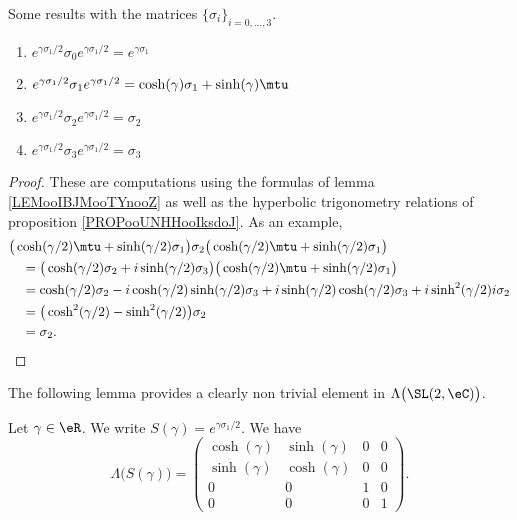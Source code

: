 \begin{lemma}       \label{LEMooPKYXooWGZkkG}
    Some results with the matrices \( \{ \sigma_i \}_{i=0,\ldots, 3}\).
    \begin{enumerate}
        \item
            \(  e^{\gamma \sigma_1/2}\sigma_0 e^{\gamma\sigma_1/2}= e^{\gamma\sigma_1}\)
        \item
            \(  e^{\gamma \sigma_1/2}\sigma_1 e^{\gamma\sigma_1/2}= \cosh(\gamma)\sigma_1+\sinh(\gamma)\mtu\)
        \item
            \(  e^{\gamma \sigma_1/2}\sigma_2 e^{\gamma\sigma_1/2}= \sigma_2\)
        \item
            \(  e^{\gamma \sigma_1/2}\sigma_3 e^{\gamma\sigma_1/2}= \sigma_3\)
    \end{enumerate}
\end{lemma}

\begin{proof}
    These are computations using the formulas of lemma \eqref{LEMooIBJMooTYnooZ} as well as the hyperbolic trigonometry relations of proposition \ref{PROPooUNHHooIksdoJ}. As an example,
    \begin{subequations}
        \begin{align}
            &\big( \cosh(\gamma/2)\mtu+\sinh(\gamma/2)\sigma_1 \big)\sigma_2\big( \cosh(\gamma/2)\mtu+\sinh(\gamma/2)\sigma_1 \big)\\
             &\quad=
                    \big( \cosh(\gamma/2)\sigma_2+i\sinh(\gamma/2)\sigma_3 \big)\big( \cosh(\gamma/2)\mtu+\sinh(\gamma/2)\sigma_1 \big)\\
            &\quad=\cosh(\gamma/2)\sigma_2-i\cosh(\gamma/2)\sinh(\gamma/2)\sigma_3+i\sinh(\gamma/2)\cosh(\gamma/2)\sigma_3+i\sinh^2(\gamma/2)i\sigma_2\\
            &\quad=\big( \cosh^2(\gamma/2)-\sinh^2(\gamma/2) \big)\sigma_2\\
            &\quad=\sigma_2.
        \end{align}
    \end{subequations}
\end{proof}

The following lemma provides a clearly non trivial element in \( \Lambda\big( \SL(2,\eC) \big)\).
\begin{lemma}     \label{LEMooGURFooRTBBmi}
    Let \( \gamma\in \eR\). We write \( S(\gamma)= e^{\gamma\sigma_1/2}\). We have
    \begin{equation}
        \Lambda\big( S(\gamma) \big)=\begin{pmatrix}
             \cosh(\gamma)   &   \sinh(\gamma)    &   0    &   0    \\
             \sinh(\gamma)   &   \cosh(\gamma)    &   0    &   0    \\
             0   &   0    &   1    &   0    \\ 
             0   &   0    &   0    &   1     
         \end{pmatrix}.
    \end{equation}
\end{lemma}

